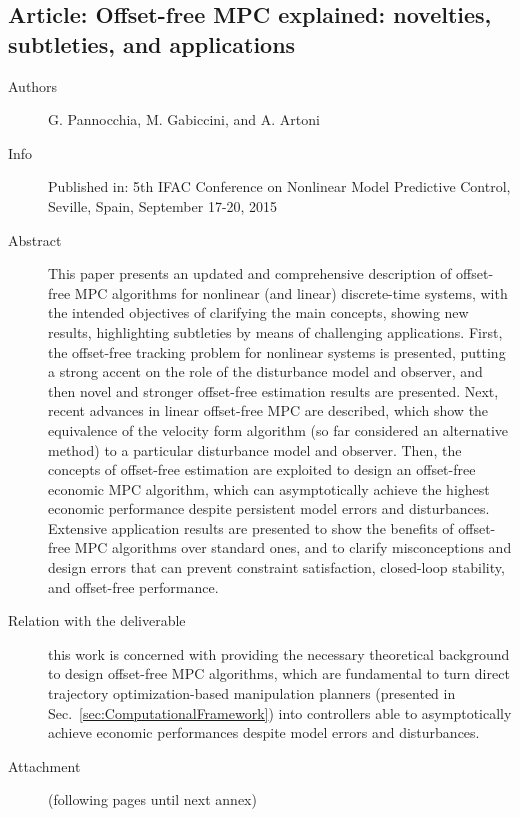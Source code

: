 \documentclass[a4paper,11pt,pdf]{pacmanreport}
\begin{document}
\subsection{Article: Offset-free MPC explained: novelties, subtleties, and applications}
\label{ann:OffsetFreeMPCExplained}
\begin{description}
    \item[Authors] G. Pannocchia, M. Gabiccini, and A. Artoni
    \item[Info] Published in: 5th IFAC Conference on Nonlinear Model Predictive Control, Seville, Spain, September 17-20, 2015
    \item[Abstract]  This paper presents an updated and comprehensive description of offset-free MPC algorithms for nonlinear (and linear) discrete-time systems, with the intended objectives of clarifying the main concepts, showing new results, highlighting subtleties by means of challenging applications. First, the offset-free tracking problem for nonlinear systems is presented, putting a strong accent on the role of the disturbance model and observer, and then novel and stronger offset-free estimation results are presented. Next, recent advances in linear offset-free MPC are described, which show the equivalence of the velocity form algorithm (so far considered an alternative method) to a particular disturbance model and observer. Then, the concepts of offset-free estimation are exploited to design an offset-free economic MPC algorithm, which can asymptotically achieve the highest economic performance despite persistent model errors and disturbances. Extensive application results are presented to show the benefits of offset-free MPC algorithms over standard ones, and to clarify misconceptions and design errors that can prevent constraint satisfaction, closed-loop stability, and offset-free performance.
    \item[Relation with the deliverable] this work is concerned with providing the necessary theoretical background to design offset-free MPC algorithms, which are fundamental to turn direct trajectory optimization-based manipulation planners (presented in Sec.~\ref{sec:ComputationalFramework}) into controllers able to asymptotically achieve economic performances despite model errors and disturbances.
    \item[Attachment] (following pages until next annex)
\end{description}

\end{document}
